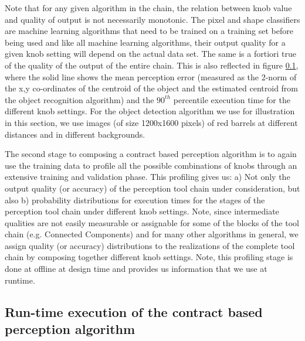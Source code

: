 Note that for any given algorithm in the chain, the relation between knob value and quality of output is not necessarily monotonic. The pixel and shape classifiers are machine learning algorithms that need to be trained on a training set before being used and like all machine learning algorithms, their output quality for a given knob setting will depend on the actual data set.
The same is a fortiori true of the quality of the output of the entire chain. This is also reflected in figure \ref{}, where the solid line shows the mean perception error (measured as the 2-norm of the x,y co-ordinates of the centroid of the object and the estimated centroid from the object recognition algorithm) and the $90^{th}$ percentile execution time for the different knob settings. For the object detection algorithm we use for illustration in this section, we use images (of size 1200x1600 pixels) of red barrels at different distances and in different backgrounds.

The second stage to composing a contract based perception algorithm is to again use the training data to profile all the possible combinations of knobs through an extensive training and validation phase. This profiling gives us: a) Not only the output quality (or accuracy) of the perception tool chain under consideration, but also b) probability distributions for execution times for the stages of the perception tool chain under different knob settings. Note, since intermediate qualities are not easily measurable or assignable for some of the blocks of the tool chain (e.g. Connected Components) and for many other algorithms in general, we assign quality (or accuracy) distributions to the realizations of the complete tool chain by composing together different knob settings. Note, this profiling stage is done at offline at design time and provides us information that we use at runtime.

\subsection{Run-time execution of the contract based perception algorithm}

